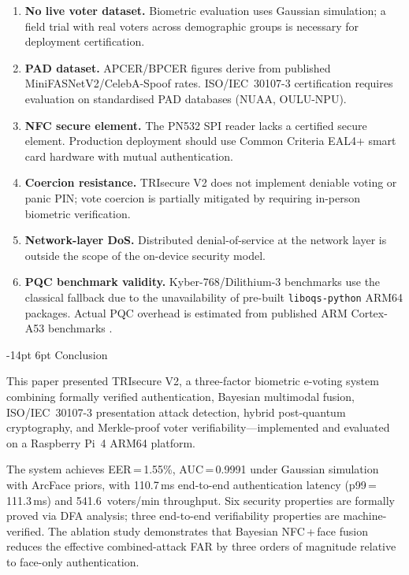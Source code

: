 \documentclass[a4paper,12pt]{article}
\makeatletter
\renewcommand\section{\@startsection{section}{1}{\z@}%
  {-14pt \@plus -4pt \@minus -2pt}{6pt \@plus 2pt}%
  {\normalfont\large\bfseries}}
\newcommand{\parencite}[1]{\citep{#1}}
\makeatother
\begin{document}
\begin{enumerate}
  \item \textbf{No live voter dataset.} Biometric evaluation uses Gaussian
    simulation; a field trial with real voters across demographic groups is
    necessary for deployment certification.
  \item \textbf{PAD dataset.} APCER/BPCER figures derive from published
    MiniFASNetV2/CelebA-Spoof rates. ISO/IEC~30107-3 certification
    requires evaluation on standardised PAD databases (NUAA, OULU-NPU).
  \item \textbf{NFC secure element.} The PN532 SPI reader lacks a certified
    secure element. Production deployment should use Common Criteria EAL4+
    smart card hardware with mutual authentication.
  \item \textbf{Coercion resistance.} TRIsecure V2 does not implement
    deniable voting or panic PIN; vote coercion is partially mitigated by
    requiring in-person biometric verification.
  \item \textbf{Network-layer DoS.} Distributed denial-of-service at the
    network layer is outside the scope of the on-device security model.
  \item \textbf{PQC benchmark validity.} Kyber-768/Dilithium-3 benchmarks
    use the classical fallback due to the unavailability of pre-built
    \texttt{liboqs-python} ARM64 packages. Actual PQC overhead is estimated
    from published ARM Cortex-A53 benchmarks \parencite{sikeridis2020pqc}.
\end{enumerate}

\section{Conclusion}\label{sec:conclusion}

This paper presented TRIsecure V2, a three-factor biometric e-voting
system combining formally verified authentication, Bayesian multimodal
fusion, ISO/IEC~30107-3 presentation attack detection, hybrid post-quantum
cryptography, and Merkle-proof voter verifiability---implemented and
evaluated on a Raspberry Pi~4 ARM64 platform.

The system achieves EER\,=\,1.55\%, AUC\,=\,0.9991 under Gaussian
simulation with ArcFace priors, with 110.7\,ms end-to-end authentication
latency (p99\,=\,111.3\,ms) and 541.6~voters/min throughput. Six security
properties are formally proved via DFA analysis; three end-to-end
verifiability properties are machine-verified. The ablation study
demonstrates that Bayesian NFC\,+\,face fusion reduces the effective
combined-attack FAR by three orders of magnitude relative to face-only
authentication.
\end{document}
